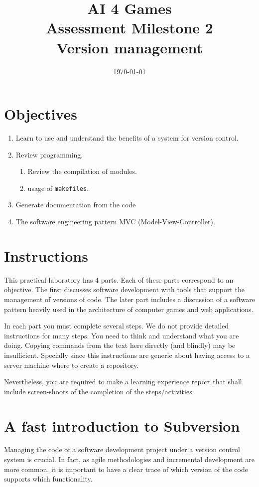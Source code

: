 \documentclass[article,12pt]{article}
\title{AI 4 Games \\
Assessment Milestone 2\\
Version management 
 }
\date{\today}
\begin{document}
\maketitle

\section*{Objectives}
\begin{enumerate}
\item  Learn to use and understand the benefits of a system for
version control.

\item  Review \Cpp\/ programming.

\begin{enumerate}
\item  Review the compilation of \Cpp\/ modules.
\item  usage of {\tt makefiles}.
\end{enumerate}

\item Generate documentation from the code

\item The software engineering pattern  MVC (Model-View-Controller).
\end{enumerate}

\section*{Instructions}
This practical laboratory has 4 parts. Each of these parts correspond to an objective.
The first discusses software development with tools that support the
management of versions of code. The later part includes
a discussion of a software pattern heavily used in the architecture
of computer games and web applications.

In each part you must complete several steps. We do not provide detailed instructions
for many steps. You need to think and understand what you are doing.
Copying commands from the text here directly (and blindly) may be insufficient.
Specially since this instructions are generic about having access to
a server machine where to create a repository.

Nevertheless, you are required to make a learning experience report that
shall include screen-shoots of the completion of the steps/activities.


\section*{A fast introduction to Subversion}
Managing the code of a software development project under a version control system
is crucial. In fact, as agile methodologies and incremental development
are more common, it is important to have a clear trace of which version
of the code supports which functionality.
\end{document}

